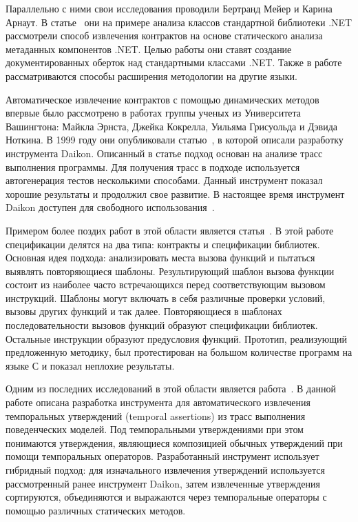 Параллельно с ними свои исследования проводили Бертранд Мейер и Карина Арнаут. В статье~\cite{uncoveringHiddenContracts} они на примере анализа классов стандартной библиотеки .NET рассмотрели способ извлечения контрактов на основе статического анализа метаданных компонентов .NET. Целью работы они ставят создание документированных оберток над стандартными классами .NET. Также в работе рассматриваются способы расширения методологии на другие языки. 

Автоматическое извлечение контрактов с помощью динамических методов впервые было рассмотрено в работах группы ученых из Университета Вашингтона: Майкла Эрнста, Джейка Кокрелла, Уильяма Грисуольда и Дэвида Ноткина. В 1999 году они опубликовали статью~\cite{discoveringInvariants}, в которой описали разработку инструмента Daikon. Описанный в статье подход основан на анализе трасс выполнения программы. Для получения трасс в подходе используется автогенерация тестов несколькими способами. Данный инструмент показал хорошие результаты и продолжил свое развитие. В настоящее время инструмент Daikon доступен для свободного использования~\cite{daikon}.

Примером более поздих работ в этой области является статья~\cite{staticPredicateMining}. В этой работе спецификации делятся на два типа: контракты и спецификации библиотек. Основная идея подхода: анализировать места вызова функций и пытаться выявлять повторяющиеся шаблоны. Результирующий шаблон вызова функции состоит из наиболее часто встречающихся перед соответствующим вызовом инструкций. Шаблоны могут включать в себя различные проверки условий, вызовы других функций и так далее. Повторяющиеся в шаблонах последовательности вызовов функций образуют спецификации библиотек. Остальные инструкции образуют предусловия функций. Прототип, реализующий предложенную методику, был протестирован на большом количестве программ на языке С и показал неплохие результаты.

Одним из последних исследований в этой области является работа~\cite{automiticAssertionsExtraction}. В данной работе описана разработка инструмента для автоматического извлечения темпоральных утверждений (temporal assertions) из трасс выполнения поведенческих моделей. Под темпоральными утверждениями при этом понимаются утверждения, являющиеся композицией обычных утверждений при помощи темпоральных операторов. Разработанный инструмент использует гибридный подход: для изначального извлечения утверждений используется рассмотренный ранее инструмент Daikon, затем извлеченные утверждения сортируются, объединяются и выражаются через темпоральные операторы с помощью различных статических методов.

